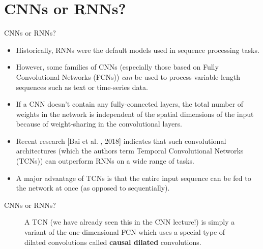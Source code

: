 \section{CNNs or RNNs?}

\begin{frame} {CNNs or RNNs?}
  \begin{itemize}
    \item Historically, RNNs were the default models used in sequence processing tasks.
    \item However, some families of CNNs (especially those based on Fully Convolutional Networks (FCNs)) \textit{can} be used to process variable-length sequences such as text or time-series data.
    \item If a CNN doesn't contain any fully-connected layers, the total number of weights in the network is independent of the spatial dimensions of the input because of weight-sharing in the convolutional layers.
    \item Recent research [Bai et al. , 2018] indicates that such convolutional architectures (which the authors term Temporal Convolutional Networks (TCNs)) can outperform RNNs on a wide range of tasks.
    \item A major advantage of TCNs is that the entire input sequence can be fed to the network at once (as opposed to sequentially).
  \end{itemize}
\end{frame}

\begin{frame} {CNNs or RNNs?}
  \begin{figure}
      \centering
      \caption{\footnotesize{A TCN (we have already seen this in the CNN lecture!) is simply a variant of the one-dimensional FCN which uses a special type of dilated convolutions called \textbf{causal dilated} convolutions.}}
  \end{figure}
\end{frame}


